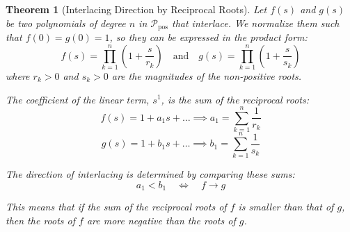 \documentclass[11pt]{article}
\theoremstyle{breakdef}
\newtheorem{theorem}{Theorem}[section]
\begin{document}
\begin{theorem}[Interlacing Direction by Reciprocal Roots]\label{def:Roots}
Let $f(s)$ and $g(s)$ be two polynomials of degree $n$ in $\mathcal{P}_{\text{pos}}$ that interlace. We normalize them such that $f(0)=g(0)=1$, so they can be expressed in the product form:
$$
f(s) = \prod_{k=1}^n \left(1 + \frac{s}{r_k}\right) \quad \text{and} \quad g(s) = \prod_{k=1}^n \left(1 + \frac{s}{s_k}\right)
$$
where $r_k > 0$ and $s_k > 0$ are the magnitudes of the non-positive roots.

The coefficient of the linear term, $s^1$, is the sum of the reciprocal roots:
\begin{equation}
f(s) = 1 + a_1 s + \dots \implies a_1 = \sum_{k=1}^n \frac{1}{r_k}
\end{equation}
\begin{equation}
g(s) = 1 + b_1 s + \dots \implies b_1 = \sum_{k=1}^n \frac{1}{s_k}
\end{equation}


The direction of interlacing is determined by comparing these sums:
\begin{equation}
a_1 < b_1 \quad \iff \quad  f \to g 
\end{equation}

This means that if the sum of the reciprocal roots of $f$ is smaller than that of $g$, then the roots of $f$ are more negative than the roots of $g$.
\end{theorem}
\end{document}
